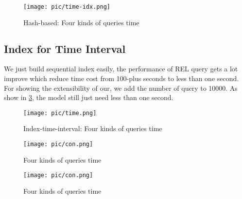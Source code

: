 \begin{figure}[H]
	\centering
	\texttt{[image: pic/time-idx.png]}\\
	\caption{Hash-based: Four kinds of queries time}
	\label{time}
\end{figure}

\subsection{Index for Time Interval}
We just build sequential index easily, the performance of REL query gets a lot improve which reduce time cost from 100-plus
seconds to less than one second. For showing the extensibility of our, we add the number of query to 10000. As show in \ref{test-add},
the model still just need less than one second.

\begin{figure}[H]
	\centering
	\texttt{[image: pic/time.png]}\\
	\caption{Index-time-interval: Four kinds of queries time}
	\label{time-idx}
\end{figure}

\begin{figure}[H]
	\centering
	\texttt{[image: pic/con.png]}\\
	\caption{Four kinds of queries time}
	\label{test-add}
\end{figure}

\begin{figure}[H]
	\centering
	\texttt{[image: pic/con.png]}\\
	\caption{Four kinds of queries time}
	\label{con}
\end{figure}



